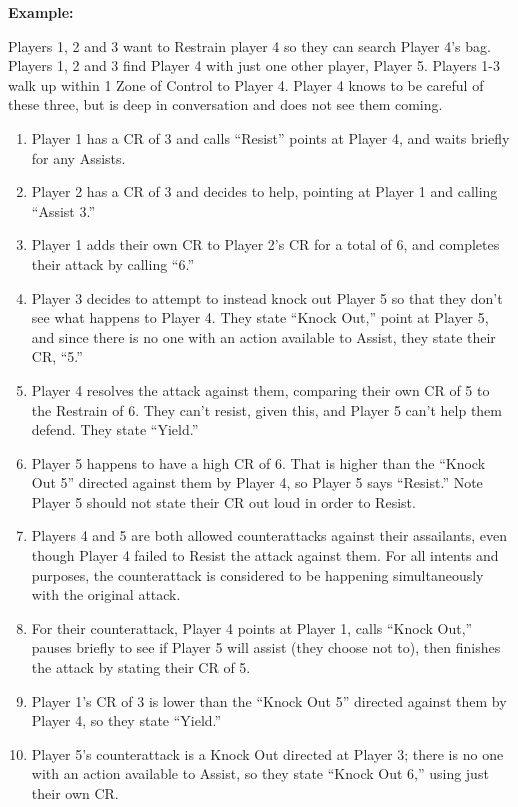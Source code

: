 \documentclass[sheet]{GL2020}
\begin{document}
\textbf{Example:}\newline

Players 1, 2 and 3 want to Restrain player 4 so they can search Player 4’s bag. Players 1, 2 and 3 find Player 4 with just one other player, Player 5. Players 1-3 walk up within 1 Zone of Control to Player 4. Player 4 knows to be careful of these three, but is deep in conversation and does not see them coming.

\begin{enumerate}
	\item Player 1 has a CR of 3 and calls ``Resist'' points at Player 4, and waits briefly for any Assists.
 	\item Player 2 has a CR of 3 and decides to help, pointing at Player 1 and calling ``Assist 3.”
	\item Player 1 adds their own CR to Player 2’s CR for a total of 6, and completes their attack by calling ``6.''
	\item Player 3 decides to attempt to instead knock out Player 5 so that they don’t see what happens to Player 4. They state ``Knock Out,'' point at Player 5, and since there is no one with an action available to Assist, they state their CR, ``5.''
	\item Player 4 resolves the attack against them, comparing their own CR of 5 to the Restrain of 6. They can’t resist, given this, and Player 5 can’t help them defend. They state ``Yield.''
	\item Player 5 happens to have a high CR of 6. That is higher than the ``Knock Out 5'' directed against them by Player 4, so Player 5 says ``Resist.'' Note Player 5 should not state their CR out loud in order to Resist.
	\item Players 4 and 5 are both allowed counterattacks against their assailants, even though Player 4 failed to Resist the attack against them. For all intents and purposes, the counterattack is considered to be happening simultaneously with the original attack.
	\item For their counterattack, Player 4 points at Player 1, calls ``Knock Out,'' pauses briefly to see if Player 5 will assist (they choose not to), then finishes the attack by stating their CR of 5.
	\item Player 1's CR of 3 is lower than the ``Knock Out 5'' directed against them by Player 4, so they state ``Yield.''
	\item Player 5's counterattack is a Knock Out directed at Player 3; there is no one with an action available to Assist, so they state ``Knock Out 6,'' using just their own CR.

\end{enumerate}
\end{document}
